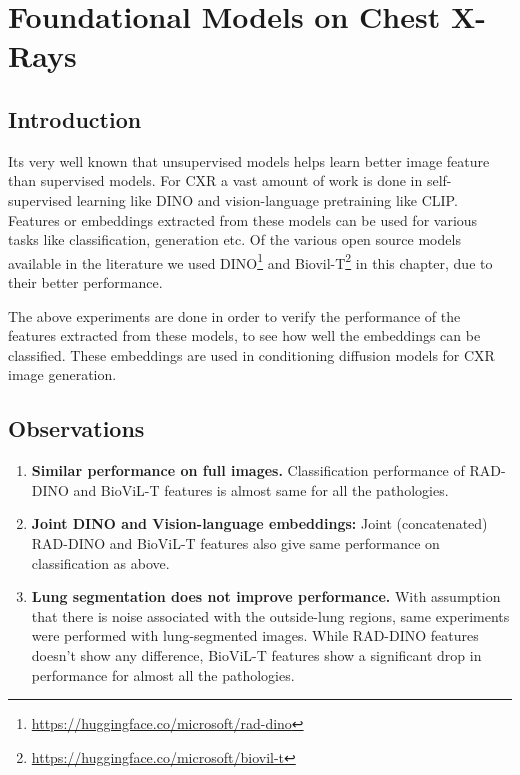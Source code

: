 \chapter{Foundational Models on Chest X-Rays}
\label{chap:baselines}


\section{Introduction}
Its very well known that unsupervised models helps learn better image feature than supervised models. 
For CXR a vast amount of work is done in self-supervised learning like DINO and vision-language pretraining like CLIP.  
Features or embeddings extracted from these models can be used for various tasks like classification, generation etc.
Of the various open source models available in the literature we used DINO\footnote{\url{https://huggingface.co/microsoft/rad-dino}} 
 and Biovil-T\footnote{\url{https://huggingface.co/microsoft/biovil-t}} in this chapter, due to their better performance.


The above experiments are done in order to verify the performance of the features extracted from these models, to see how well the 
embeddings can be classified. These embeddings are used in conditioning diffusion models for CXR image generation.


% 

% 

\section{Observations}

\begin{enumerate}
  \item \textbf{Similar performance on full images.} Classification performance of RAD-DINO and BioViL-T features is almost same 
  for all the pathologies.

  \item \textbf{Joint DINO and Vision-language embeddings:}  Joint (concatenated) RAD-DINO and BioViL-T features also give same performance
  on classification as above. 

  \item \textbf{Lung segmentation does not improve performance.} With assumption that there is noise associated with the 
  outside-lung regions, same experiments were performed with lung-segmented images. While RAD-DINO features doesn't show
  any difference, BioViL-T features show a significant drop in performance for almost all the pathologies. 

\end{enumerate}

